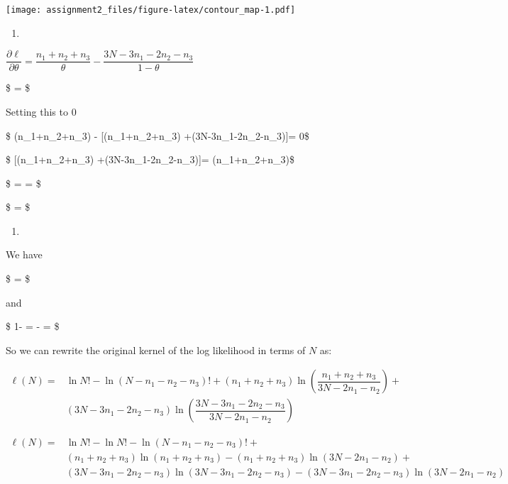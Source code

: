 \documentclass[]{article}
\begin{document}
\texttt{[image: assignment2\_files/figure-latex/contour\_map-1.pdf]}

\pagebreak

\begin{enumerate}
\def\labelenumi{\alph{enumi})}
\setcounter{enumi}{4}
\item
\end{enumerate}

\(\dfrac{\partial \ell}{\partial\theta} = \dfrac{n_1+n_2+n_3}{\theta} - \dfrac{3N-3n_1-2n_2-n_3}{1-\theta}\)

\$ =
\$

Setting this to \(0\)

\$ (n\_1+n\_2+n\_3) - {[}(n\_1+n\_2+n\_3)
+(3N-3n\_1-2n\_2-n\_3){]}\theta = 0\$

\$ {[}(n\_1+n\_2+n\_3) +(3N-3n\_1-2n\_2-n\_3){]}\theta =
(n\_1+n\_2+n\_3)\$

\$ \theta =  =
\$

\$ \hat{\theta} = \$

\begin{enumerate}
\def\labelenumi{\alph{enumi})}
\setcounter{enumi}{5}
\item
\end{enumerate}

We have

\$ \hat{\theta} = \$

and

\$ 1-\hat{\theta} =  -
 =
\$

So we can rewrite the original kernel of the log likelihood in terms of
\(N\) as:

\(\begin{aligned}\ell(N) =& \ln N!-\ln (N-n_1-n_2-n_3)!+(n_1+n_2+n_3)\ln \left(\dfrac{n_1+n_2+n_3}{3N - 2n_1-n_2}\right) + \\&(3N-3n_1-2n_2-n_3)\ln \left(\dfrac{3N - 3n_1-2n_2-n_3}{3N - 2n_1-n_2}\right)\end{aligned}\)

\(\begin{aligned}\ell(N)=&\ln N!-\ln N!-\ln (N-n_1-n_2-n_3)!+ \\&(n_1+n_2+n_3)\ln (n_1+n_2+n_3)-(n_1+n_2+n_3)\ln(3N-2n_1-n_2)+\\&(3N-3n_1-2n_2-n_3)\ln (3N - 3n_1-2n_2-n_3)-(3N-3n_1-2n_2-n_3)\ln(3N -2n_1-n_2)\end{aligned}\)
\end{document}
